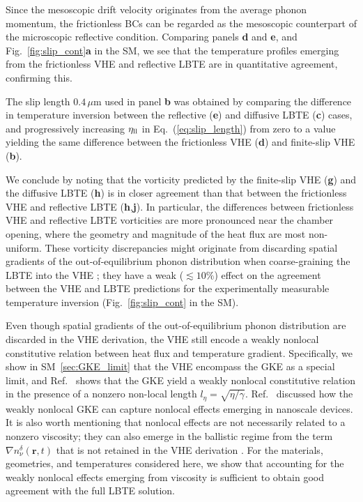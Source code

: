 \documentclass[
prb,
twocolumn,
superscriptaddress,
 amsmath,amssymb,
 aps,
longbibliography,
]{revtex4-2}
\begin{document}
Since the mesoscopic drift velocity originates from the average phonon momentum, the frictionless BCs can be regarded as the mesoscopic counterpart of the microscopic reflective condition.
Comparing panels \textbf{d} and \textbf{e}, and Fig.~\ref{fig:slip_cont}\textbf{a} in the SM, we see that the temperature profiles emerging from the frictionless VHE and reflective LBTE are in quantitative agreement, confirming this.

The slip length $0.4\,\mu\mathrm{m}$ used in panel \textbf{b} was obtained by comparing the difference in temperature inversion between the reflective (\textbf{e}) and diffusive LBTE (\textbf{c}) cases, and progressively increasing $\eta_{\rm ll}$ in Eq.~(\ref{eq:slip_length}) from zero to a value yielding the same difference between the frictionless VHE (\textbf{d}) and finite-slip VHE (\textbf{b}).

We conclude by noting that the vorticity predicted by the finite-slip VHE (\textbf{g}) and the diffusive LBTE (\textbf{h}) is in closer agreement than that between the frictionless VHE and reflective LBTE (\textbf{h},\textbf{j}).
In particular, the differences between frictionless VHE and reflective LBTE vorticities are more pronounced near the chamber opening, where the geometry and magnitude of the heat flux are most non-uniform.
These vorticity discrepancies might originate from discarding spatial gradients of the out-of-equilibrium phonon distribution when coarse-graining the LBTE into the VHE \cite{Simoncelli2020}; they have a weak ($\lesssim 10\%$) effect on the agreement between the VHE and LBTE predictions for the experimentally measurable temperature inversion (Fig.~\ref{fig:slip_cont} in the SM).

Even though spatial gradients of the out-of-equilibrium phonon distribution are discarded in the VHE derivation, the VHE still encode a weakly nonlocal constitutive relation between heat flux and temperature gradient.
Specifically, we show in SM~\ref{sec:GKE_limit} that the VHE encompass the GKE as a special limit, and Ref.~\cite{gurcan_transport_2013} shows that the GKE yield a weakly nonlocal constitutive relation in the presence of a nonzero non-local length $l_\eta=\sqrt{\eta/\gamma}$.  Ref.~\cite{sendra_hydrodynamic_2022} discussed how the weakly nonlocal GKE can capture nonlocal effects emerging in nanoscale devices.
It is also worth mentioning that nonlocal effects are not necessarily related to a nonzero viscosity; they can also emerge in the ballistic regime from the term $\nabla n^\delta_\nu(\bm{r},t)$ that is not retained in the VHE derivation \cite{allen_analysis_2018}. For the materials, geometries, and temperatures considered here, we show that accounting for the weakly nonlocal effects emerging from viscosity is sufficient to obtain good agreement with the full LBTE solution.
\end{document}
